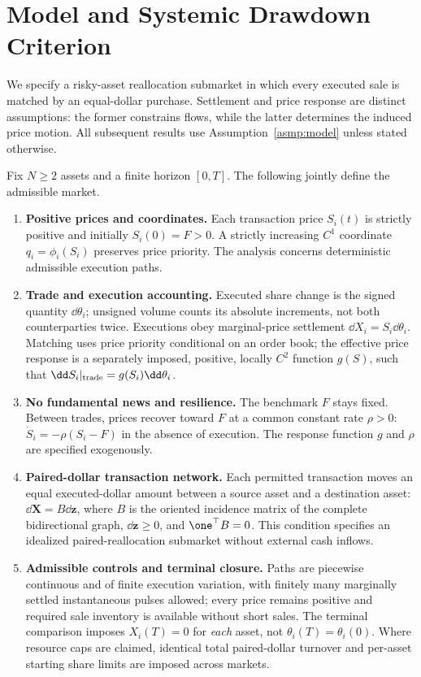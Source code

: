 \documentclass[review,hidelinks,onefignum,onetabnum]{siamonline250211}
\begin{document}
\section{Model and Systemic Drawdown Criterion}\label{sec:micro}\label{sec:model}
We specify a risky-asset reallocation submarket in which every executed sale is matched by an equal-dollar purchase. Settlement and price response are distinct assumptions: the former constrains flows, while the latter determines the induced price motion. All subsequent results use Assumption~\ref{asmp:model} unless stated otherwise.

\begin{assumption}\label{asmp:model}
Fix $N\ge2$ assets and a finite horizon $[0,T]$. The following jointly define the admissible market.
\begin{enumerate}[label=\textup{(M\arabic*)},leftmargin=2.9em,itemsep=0.20em]
\item \textbf{Positive prices and coordinates.} Each transaction price $S_i(t)$ is strictly positive and initially $S_i(0)=F>0$. A strictly increasing $C^1$ coordinate $q_i=\phi_i(S_i)$ preserves price priority. The analysis concerns deterministic admissible execution paths.
\item \textbf{Trade and execution accounting.} Executed share change is the signed quantity $\dd\theta_i$; unsigned volume counts its absolute increments, not both counterparties twice. Executions obey marginal-price settlement $\dd X_i=S_i\dd\theta_i$. Matching uses price priority conditional on an order book; the effective price response is a separately imposed, positive, locally $C^2$ function $g(S)$, such that $\dd S_i|_{\rm trade}=g(S_i)\dd\theta_i$.
\item \textbf{No fundamental news and resilience.} The benchmark $F$ stays fixed. Between trades, prices recover toward $F$ at a common constant rate $\rho>0$: $\dot S_i=-\rho(S_i-F)$ in the absence of execution. The response function $g$ and $\rho$ are specified exogenously.
\item \textbf{Paired-dollar transaction network.} Each permitted transaction moves an equal executed-dollar amount between a source asset and a destination asset: $\dd\bm X=B\dd\bm z$, where $B$ is the oriented incidence matrix of the complete bidirectional graph, $\dd\bm z\ge0$, and $\one^\top B=0$. This condition specifies an idealized paired-reallocation submarket without external cash inflows.
\item \textbf{Admissible controls and terminal closure.} Paths are piecewise continuous and of finite execution variation, with finitely many marginally settled instantaneous pulses allowed; every price remains positive and required sale inventory is available without short sales. The terminal comparison imposes $X_i(T)=0$ for \emph{each} asset, not $\theta_i(T)=\theta_i(0)$. Where resource caps are claimed, identical total paired-dollar turnover and per-asset starting share limits are imposed across markets.
\end{enumerate}
\end{assumption}
\end{document}

